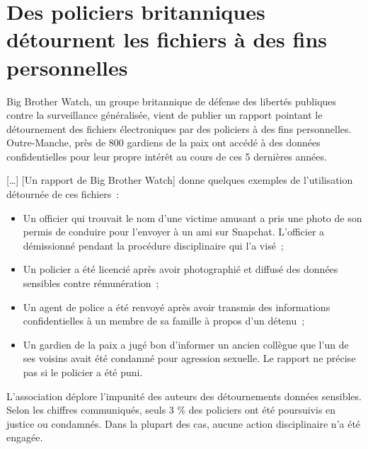 \section{Des policiers britanniques détournent les fichiers à des fins personnelles}

Big Brother Watch, un groupe britannique de défense des libertés publiques contre la surveillance généralisée, vient de publier un rapport pointant le détournement des fichiers électroniques par des policiers à des fins personnelles. Outre-Manche, près de 800 gardiens de la paix ont accédé à des données confidentielles pour leur propre intérêt au cours de ces 5 dernières années.

[…] [Un rapport de Big Brother Watch] donne quelques exemples de l'utilisation détournée de ces fichiers :

\begin{itemize}
  \item Un officier qui trouvait le nom d'une victime amusant a pris une photo de son permis de conduire pour l'envoyer à un ami sur Snapchat. L'officier a démissionné pendant la procédure disciplinaire qui l'a visé ;
  \item Un policier a été licencié après avoir photographié et diffusé des données sensibles contre rémunération ;
  \item Un agent de police a été renvoyé après avoir transmis des informations confidentielles à un membre de sa famille à propos d'un détenu ;
  \item Un gardien de la paix a jugé bon d'informer un ancien collègue que l'un de ses voisins avait été condamné pour agression sexuelle. Le rapport ne précise pas si le policier a été puni.
\end{itemize}

L'association déplore l'impunité des auteurs des détournements données sensibles. Selon les chiffres communiqués, seuls 3 \% des policiers ont été poursuivis en justice ou condamnés. Dans la plupart des cas, aucune action disciplinaire n'a été engagée.
